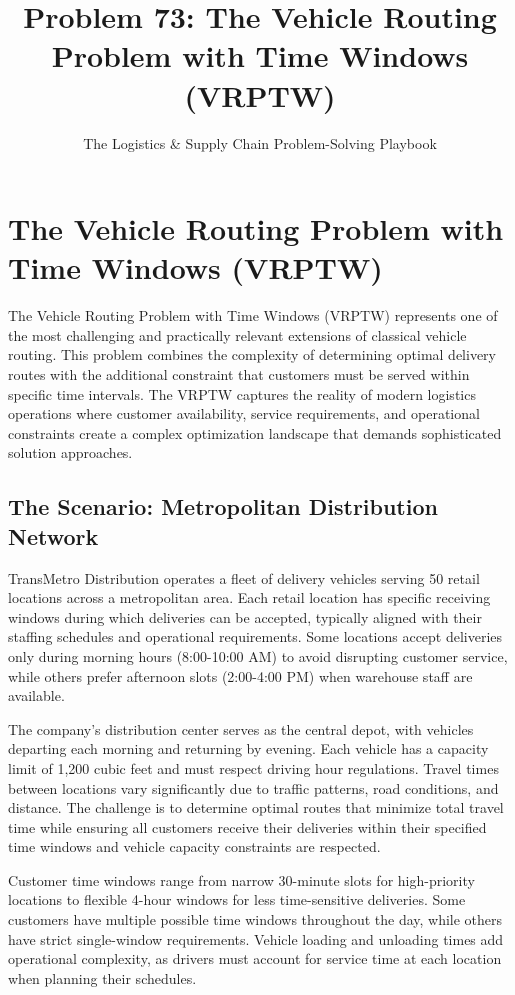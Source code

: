 \documentclass{article}
\title{Problem 73: The Vehicle Routing Problem with Time Windows (VRPTW)}
\author{The Logistics \& Supply Chain Problem-Solving Playbook}
\date{}
\begin{document}
\maketitle

\section{The Vehicle Routing Problem with Time Windows (VRPTW)}

The Vehicle Routing Problem with Time Windows (VRPTW) represents one of the most challenging and practically relevant extensions of classical vehicle routing. This problem combines the complexity of determining optimal delivery routes with the additional constraint that customers must be served within specific time intervals. The VRPTW captures the reality of modern logistics operations where customer availability, service requirements, and operational constraints create a complex optimization landscape that demands sophisticated solution approaches.

\subsection{The Scenario: Metropolitan Distribution Network}

TransMetro Distribution operates a fleet of delivery vehicles serving 50 retail locations across a metropolitan area. Each retail location has specific receiving windows during which deliveries can be accepted, typically aligned with their staffing schedules and operational requirements. Some locations accept deliveries only during morning hours (8:00-10:00 AM) to avoid disrupting customer service, while others prefer afternoon slots (2:00-4:00 PM) when warehouse staff are available.

The company's distribution center serves as the central depot, with vehicles departing each morning and returning by evening. Each vehicle has a capacity limit of 1,200 cubic feet and must respect driving hour regulations. Travel times between locations vary significantly due to traffic patterns, road conditions, and distance. The challenge is to determine optimal routes that minimize total travel time while ensuring all customers receive their deliveries within their specified time windows and vehicle capacity constraints are respected.

Customer time windows range from narrow 30-minute slots for high-priority locations to flexible 4-hour windows for less time-sensitive deliveries. Some customers have multiple possible time windows throughout the day, while others have strict single-window requirements. Vehicle loading and unloading times add operational complexity, as drivers must account for service time at each location when planning their schedules.
\end{document}
